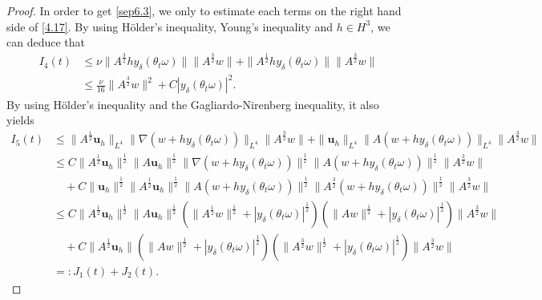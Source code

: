 \documentclass{elsarticle}
\theoremstyle{definition}
\numberwithin{equation}{section}
\begin{document}
\begin{proof}
In order to get \eqref{sep6.3}, we only to estimate each terms on the right hand side of \eqref{4.17}.
By using H\"{o}lder's inequality, Young's inequality and $h\in H^3$,  we can deduce that
\begin{align}
I_{4}(t)&\leq  \nu \|A^{\frac32}hy_\delta(\theta_t\omega)\|\|A^{\frac32}w\|+ \|A^{\frac12}hy_\delta(\theta_t\omega)\|\|A^{\frac32}w\|\nonumber\\
&\leq \frac{ \nu }{16}\|A^{\frac32}w\|^2+C  |y_\delta(\theta_t\omega)|^2. \label{4.18}
\end{align}
By using H\"{o}lder's inequality and the Gagliardo-Nirenberg inequality, it also yields
\begin{align}
I_{5}(t)&\leq\|A^\frac12\textbf{u}_h\|_{L^4}\|\nabla(w+hy_\delta(\theta_t\omega))\|_{L^4}\|A^\frac32w\|
+\|\textbf{u}_h\|_{L^4}\|A(w+hy_\delta(\theta_t\omega))\|_{L^4}\|A^\frac32w\|
\nonumber\\
&\leq C\|A^\frac12\textbf{u}_h\|^\frac12\|A\textbf{u}_h\|^\frac12
\|\nabla(w+hy_\delta(\theta_t\omega))\|^\frac12\|A(w+hy_\delta(\theta_t\omega))\|^\frac12
\|A^\frac32w\|\nonumber\\
& \quad +C\|\textbf{u}_h\|^\frac12\|A^{\frac12}\textbf{u}_h\|^\frac12
\|A(w+hy_\delta(\theta_t\omega))\|^\frac12\|A^{\frac32}(w+hy_\delta(\theta_t\omega))\|^\frac12\|A^\frac32w\|\nonumber\\
&\leq  C\|A^\frac12\textbf{u}_h\|^\frac12\|A\textbf{u}_h\|^\frac12
\left(\|A^{\frac12}w\|^\frac12+ |y_\delta(\theta_t\omega)|^\frac12 \right) \left (\|Aw\|^\frac12+ |y_\delta(\theta_t\omega) |^\frac12 \right)
\|A^\frac32w\|\nonumber\\
&\quad +C\|A^{\frac12}\textbf{u}_h\| \left (\|Aw\|^\frac12+ |y_\delta(\theta_t\omega)|^\frac12\right)\left(\|A^{\frac32}w\|^\frac12
+ | y_\delta(\theta_t\omega)|^\frac12 \right)\|A^\frac32w\|\nonumber\\
&=: J_1(t) +J_2(t) . \nonumber
\end{align}


\end{proof}
\end{document}
